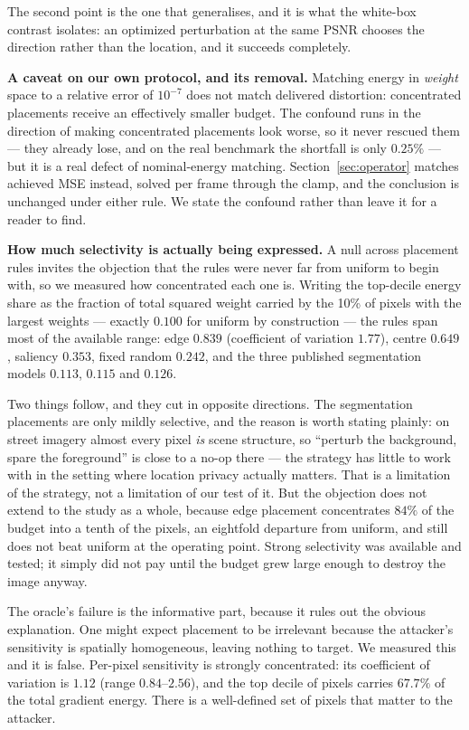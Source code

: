 \documentclass[10pt,journal]{IEEEtran}
\begin{document}
The second point is the one that generalises, and it is what the white-box
contrast isolates: an optimized perturbation at the same PSNR chooses the
direction rather than the location, and it succeeds completely.

\textbf{A caveat on our own protocol, and its removal.} Matching energy in
\emph{weight} space to a relative error of $10^{-7}$ does not match delivered
distortion: concentrated placements receive an effectively smaller budget. The
confound runs in the direction of making concentrated placements look worse,
so it never rescued them --- they already lose, and on the real benchmark the
shortfall is only $0.25\%$ --- but it is a real defect of nominal-energy
matching. Section~\ref{sec:operator} matches achieved MSE instead, solved per
frame through the clamp, and the conclusion is unchanged under either rule. We
state the confound rather than leave it for a reader to find.

\textbf{How much selectivity is actually being expressed.} A null across
placement rules invites the objection that the rules were never far from
uniform to begin with, so we measured how concentrated each one is. Writing
the top-decile energy share as the fraction of total squared weight carried by
the 10\% of pixels with the largest weights --- exactly $0.100$ for uniform by
construction --- the rules span most of the available range: edge $0.839$
(coefficient of variation $1.77$), centre $0.649$, saliency $0.353$, fixed
random $0.242$, and the three published segmentation models $0.113$, $0.115$
and $0.126$.

Two things follow, and they cut in opposite directions. The segmentation
placements are only mildly selective, and the reason is worth stating plainly:
on street imagery almost every pixel \emph{is} scene structure, so ``perturb
the background, spare the foreground'' is close to a no-op there --- the
strategy has little to work with in the setting where location privacy
actually matters. That is a limitation of the strategy, not a limitation of
our test of it. But the objection does not extend to the study as a whole,
because edge placement concentrates $84\%$ of the budget into a tenth of the
pixels, an eightfold departure from uniform, and still does not beat uniform
at the operating point. Strong selectivity was available and tested; it simply
did not pay until the budget grew large enough to destroy the image anyway.

The oracle's failure is the informative part, because it rules out the
obvious explanation. One might expect placement to be irrelevant because the
attacker's sensitivity is spatially homogeneous, leaving nothing to target.
We measured this and it is false. Per-pixel sensitivity is strongly
concentrated: its coefficient of variation is $1.12$ (range $0.84$--$2.56$),
and the top decile of pixels carries $67.7\%$ of the total gradient energy.
There is a well-defined set of pixels that matter to the attacker.
\end{document}
